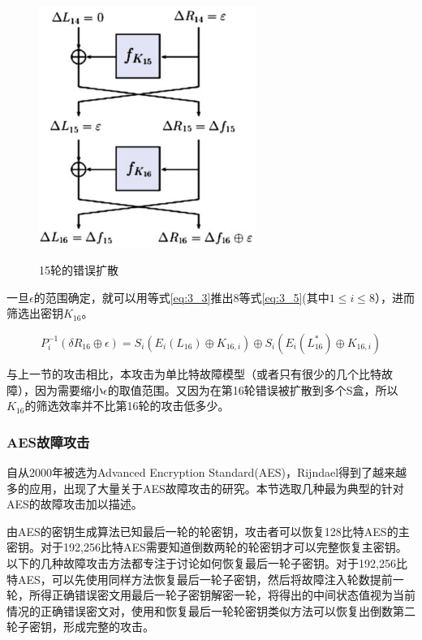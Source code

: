 \documentclass[a4paper,12pt]{article}
\begin{document}
\begin{CJK}{UTF8}{gkai}
\begin{figure}
\centering
\caption{15轮的错误扩散}
\includegraphics[width=200pt]{des_15_round_propagation.jpg}
\label{des_error_propagation_15_round}
\end{figure}

一旦$\epsilon$的范围确定，就可以用等式\ref{eq:3_3}推出8等式\ref{eq:3_5}(其中$1 \leq i \leq 8$），进而筛选出密钥$K_{16}$。

\begin{equation}
\label{eq:3_5}
P_i^{-1}(\delta R_{16} \oplus \epsilon) = S_i(E_i(L_{16}) \oplus K_{16,i}) \oplus S_i(E_i(L_{16}^*) \oplus K_{16,i})
\end{equation}

与上一节的攻击相比，本攻击为单比特故障模型（或者只有很少的几个比特故障），因为需要缩小$\epsilon$的取值范围。又因为在第16轮错误被扩散到多个S盒，所以$K_{16}$的筛选效率并不比第16轮的攻击低多少。

\subsubsection{AES故障攻击}

自从2000年被选为Advanced Encryption Standard(AES)，Rijndael得到了越来越多的应用，出现了大量关于AES故障攻击的研究。本节选取几种最为典型的针对AES的故障攻击加以描述。

由AES的密钥生成算法已知最后一轮的轮密钥，攻击者可以恢复128比特AES的主密钥。对于192,256比特AES需要知道倒数两轮的轮密钥才可以完整恢复主密钥。以下的几种故障攻击方法都专注于讨论如何恢复最后一轮子密钥。对于192,256比特AES，可以先使用同样方法恢复最后一轮子密钥，然后将故障注入轮数提前一轮，所得正确错误密文用最后一轮子密钥解密一轮，将得出的中间状态值视为当前情况的正确错误密文对，使用和恢复最后一轮轮密钥类似方法可以恢复出倒数第二轮子密钥，形成完整的攻击。


\end{CJK}
\end{document}
